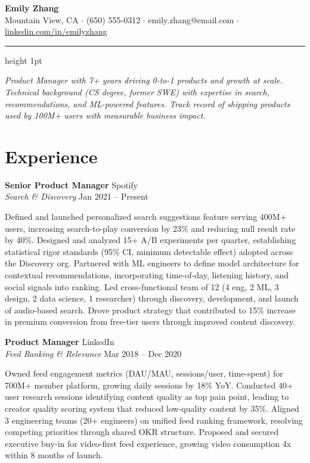 \documentclass[11pt,letterpaper]{article}
\begin{document}
\begin{center}
{\LARGE\bfseries Emily Zhang}\\[6pt]
{\small Mountain View, CA $\cdot$ (650) 555-0312 $\cdot$ emily.zhang@email.com $\cdot$ \href{https://linkedin.com/in/emilyzhang}{linkedin.com/in/emilyzhang}}
\end{center}

\vspace{4pt}
{\color{accent}\hrule height 1pt}
\vspace{8pt}

{\itshape Product Manager with 7+ years driving 0-to-1 products and growth at scale. Technical background (CS degree, former SWE) with expertise in search, recommendations, and ML-powered features. Track record of shipping products used by 100M+ users with measurable business impact.}

\section{Experience}

{\large\bfseries Senior Product Manager} \hfill Spotify\\
{\color{accent}\itshape Search \& Discovery} \hfill {\small Jan 2021 -- Present}

\vspace{4pt}
Defined and launched personalized search suggestions feature serving 400M+ users, increasing search-to-play conversion by 23\% and reducing null result rate by 40\%. Designed and analyzed 15+ A/B experiments per quarter, establishing statistical rigor standards (95\% CI, minimum detectable effect) adopted across the Discovery org. Partnered with ML engineers to define model architecture for contextual recommendations, incorporating time-of-day, listening history, and social signals into ranking. Led cross-functional team of 12 (4 eng, 2 ML, 3 design, 2 data science, 1 researcher) through discovery, development, and launch of audio-based search. Drove product strategy that contributed to 15\% increase in premium conversion from free-tier users through improved content discovery.

\vspace{8pt}
{\large\bfseries Product Manager} \hfill LinkedIn\\
{\color{accent}\itshape Feed Ranking \& Relevance} \hfill {\small Mar 2018 -- Dec 2020}

\vspace{4pt}
Owned feed engagement metrics (DAU/MAU, sessions/user, time-spent) for 700M+ member platform, growing daily sessions by 18\% YoY. Conducted 40+ user research sessions identifying content quality as top pain point, leading to creator quality scoring system that reduced low-quality content by 35\%. Aligned 3 engineering teams (20+ engineers) on unified feed ranking framework, resolving competing priorities through shared OKR structure. Proposed and secured executive buy-in for video-first feed experience, growing video consumption 4x within 8 months of launch.
\end{document}
